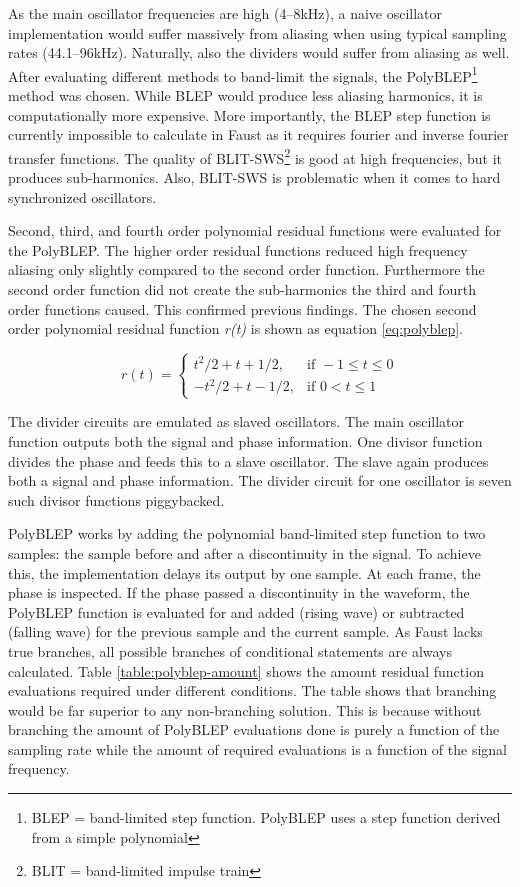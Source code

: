 \documentclass[11pt,a4paper]{article}
\begin{document}
As the main oscillator frequencies are high (4--8kHz), a naive oscillator implementation would suffer massively from aliasing when using typical sampling rates (44.1--96kHz). Naturally, also the dividers would suffer from aliasing as well. After evaluating different methods to band-limit the signals, the PolyBLEP\footnote{BLEP = band-limited step function. PolyBLEP uses a step function derived from a simple polynomial}\cite{antialiasing} method was chosen. While BLEP\cite{hardsync} would produce less aliasing harmonics, it is computationally more expensive. More importantly, the BLEP step function is currently impossible to calculate in Faust as it requires fourier and inverse fourier transfer functions. The quality of BLIT-SWS\footnote{BLIT = band-limited impulse train}\cite{blit} is good at high frequencies, but it produces sub-harmonics\cite{antialiasing}. Also, BLIT-SWS is problematic when it comes to hard synchronized oscillators\cite{hardsync}.

Second, third, and fourth order polynomial residual functions were evaluated for the PolyBLEP. The higher order residual functions reduced high frequency aliasing only slightly compared to the second order function. Furthermore the second order function did not create the sub-harmonics the third and fourth order functions caused. This confirmed previous findings\cite{pekonen}. The chosen second order polynomial residual function \emph{r(t)} is shown as equation \ref{eq:polyblep}.

\begin{equation}
\label{eq:polyblep}
r(t) = \begin{cases} 	t^2/2  + t + 1/2, & \mbox{if } -1 \leq t \leq 0\\ 
			-t^2/2 + t - 1/2, & \mbox{if } 0 < t \leq 1 \end{cases}
\end{equation}

The divider circuits are emulated as slaved oscillators. The main oscillator function outputs both the signal and phase information. One divisor function divides the phase and feeds this to a slave oscillator. The slave again produces both a signal and phase information. The divider circuit for one oscillator is seven such divisor functions piggybacked.

PolyBLEP works by adding the polynomial band-limited step function to two samples: the sample before and after a discontinuity in the signal. To achieve this, the implementation delays its output by one sample. At each frame, the phase is inspected. If the phase passed a discontinuity in the waveform, the PolyBLEP function is evaluated for and added (rising wave) or subtracted (falling wave) for the previous sample and the current sample. As Faust lacks true branches, all possible branches of conditional statements are always calculated. Table \ref{table:polyblep-amount} shows the amount residual function evaluations required under different conditions. The table shows that branching would be far superior to any non-branching solution. This is because without branching the amount of PolyBLEP evaluations done is purely a function of the sampling rate while the amount of required evaluations is a function of the signal frequency. 
\end{document}
